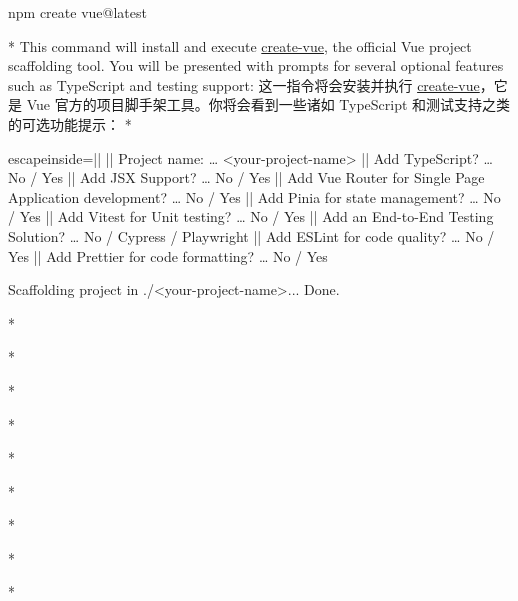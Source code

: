 \begin{paracol}{2}
\begin{codeShell}
\end{codeShell}
\switchcolumn
\begin{codeShell}
npm create vue@latest
\end{codeShell}
\switchcolumn[0]*%
This command will install and execute
\href{https://github.com/vuejs/create-vue}{create-vue}, the official Vue
project scaffolding tool. You will be presented with prompts for several
optional features such as TypeScript and testing support:
\switchcolumn
这一指令将会安装并执行
\href{https://github.com/vuejs/create-vue}{create-vue}，它是 Vue
官方的项目脚手架工具。你将会看到一些诸如 TypeScript
和测试支持之类的可选功能提示：
\switchcolumn[0]*%
\begin{codeConsole*}{escapeinside=||}
|\checkmark| Project name: … <your-project-name>
|\checkmark| Add TypeScript? … No / Yes
|\checkmark| Add JSX Support? … No / Yes
|\checkmark| Add Vue Router for Single Page Application development? … No / Yes
|\checkmark| Add Pinia for state management? … No / Yes
|\checkmark| Add Vitest for Unit testing? … No / Yes
|\checkmark| Add an End-to-End Testing Solution? … No / Cypress / Playwright
|\checkmark| Add ESLint for code quality? … No / Yes
|\checkmark| Add Prettier for code formatting? … No / Yes

Scaffolding project in ./<your-project-name>...
Done.
\end{codeConsole*}
\switchcolumn
\begin{codeConsole}

\end{codeConsole}    
\switchcolumn[0]*%

\switchcolumn

\switchcolumn[0]*%

\switchcolumn

\switchcolumn[0]*%

\switchcolumn

\switchcolumn[0]*%

\switchcolumn

\switchcolumn[0]*%

\switchcolumn

\switchcolumn[0]*%

\switchcolumn

\switchcolumn[0]*%

\switchcolumn

\switchcolumn[0]*%

\switchcolumn

\switchcolumn[0]*%


\end{paracol}
